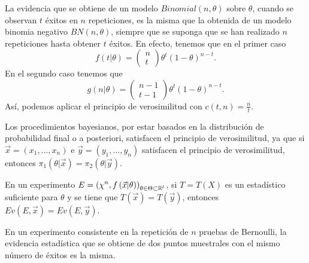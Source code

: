 \begin{eg}
La evidencia que se obtiene de un modelo $\displaystyle Binomial\left(n,\theta\right) $ sobre $\displaystyle \theta $, cuando se observan $\displaystyle t $ éxitos en $\displaystyle n $  repeticiones, es la misma que la obtenida de un modelo binomia negativo $\displaystyle BN\left(n, \theta \right) $, siempre que se suponga que se han realizado $\displaystyle n $ repeticiones hasta obtener $\displaystyle t $ éxitos. 
En efecto, tenemos que en el primer caso 
\[f\left(t | \theta \right)=\begin{pmatrix} n \\ t \end{pmatrix}\theta ^{t}\left(1-\theta \right)^{n-t} .\]
En el segundo caso tenemos que 
\[g\left(n|\theta \right)=\begin{pmatrix} n-1 \\ t-1 \end{pmatrix}\theta^{t}\left(1-\theta \right)^{n-t} .\]
Así, podemos aplicar el principio de verosimilitud con $\displaystyle c\left(t,n\right)=\frac{n}{t} $. 
\end{eg}
\begin{eg}
Los procedimientos bayesianos, por estar basados en la distribución de probabilidad final o a posteriori, satisfacen el principio de verosimilitud, ya que si $\displaystyle \vec{x}=\left(x_{1}, \ldots, x_{n}\right) $ e $\displaystyle \vec{y}=\left(y_{1}, \ldots, y_{n}\right) $ satisfacen el principio de verosimilitud, entonces $\displaystyle \pi_{1}\left(\theta|\vec{x}\right)=\pi_{2}\left(\theta|\vec{y}\right) $. 
\end{eg}
\begin{definition}
En un experimento $\displaystyle E = \left(\chi^{n}, f\left(\vec{x} | \theta \right)\right)_{\theta \in \Theta \subset \mathbb{R}^{l}} $, si $\displaystyle T = T\left(X\right) $ es un estadístico suficiente para $\displaystyle \theta $ y se tiene que $\displaystyle T\left(\vec{x}\right)=T\left(\vec{y}\right) $, entonces $\displaystyle Ev\left(E, \vec{x}\right)=Ev\left(E, \vec{y}\right) $. 
\end{definition}
\begin{eg}
En un experimento consistente en la repetición de $\displaystyle n $ pruebas de Bernoulli, la evidencia estadística que se obtiene de dos puntos muestrales con el mismo número de éxitos es la misma.
\end{eg}
